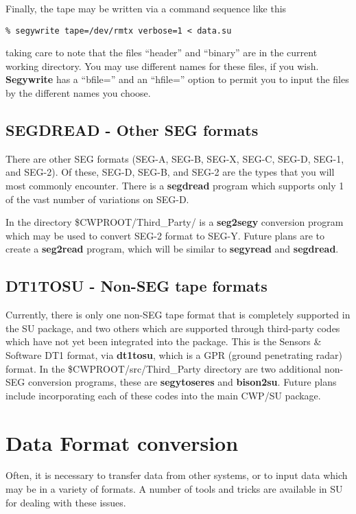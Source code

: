 {{{Finally, the tape may be written via a command sequence like this
{\small \begin{verbatim}
% segywrite tape=/dev/rmtx verbose=1 < data.su
\end{verbatim}} \noindent
taking care to note that the files ``header'' and ``binary'' are
in the current working directory. You may use different names
for these files, if you wish. {\bf Segywrite\/} has a ``bfile='' 
and an ``hfile='' option to permit you to input the files by
the different names you choose.

\subsection{SEGDREAD - Other SEG formats}
There are other SEG formats (SEG-A, SEG-B, SEG-X, SEG-C, SEG-D, SEG-1,
and SEG-2).
Of these, SEG-D, SEG-B, and SEG-2 are the types that you will most
commonly encounter. 
There is a {\bf segdread\/} program which supports only 1 of the vast
number of variations on SEG-D.

In the directory \$CWPROOT/Third\_Party/   is a {\bf seg2segy\/} conversion
program which may be used to convert SEG-2 format to SEG-Y.
Future plans are to create a {\bf seg2read\/} program, which will
be similar to {\bf segyread\/} and {\bf segdread\/}.

\subsection{DT1TOSU - Non-SEG tape formats}

Currently, there is only one non-SEG tape format that is completely supported
in the SU package, and two others which are supported through third-party
codes which have not yet been integrated into the package.
This is the Sensors \& Software DT1 format,
via {\bf dt1tosu}, which is a GPR (ground penetrating radar) format.
In the \$CWPROOT/src/Third\_Party directory are two additional
non-SEG conversion programs, these are {\bf segytoseres\/} and 
{\bf bison2su}.
Future plans include incorporating each of these codes into the main
CWP/SU package.

\section{Data Format conversion}

Often, it is necessary to transfer data from other systems, or
to input data which may be in a variety of formats. A number
of tools and tricks are available in SU for dealing with these
issues.

}}}
